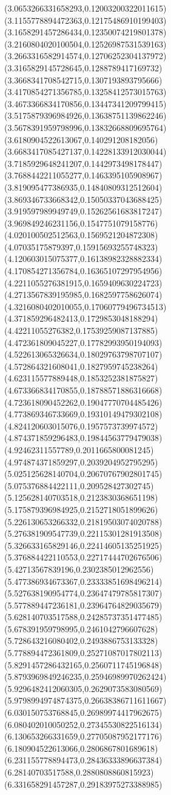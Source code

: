 {(3.0653266331658293,0.12003200322011615)
(3.1155778894472363,0.12175486910199403)
(3.1658291457286434,0.12350074219801378)
(3.2160804020100504,0.12526987531539163)
(3.2663316582914574,0.12706252304137972)
(3.3165829145728645,0.1288789417169732)
(3.3668341708542715,0.1307193893795666)
(3.4170854271356785,0.13258412573015763)
(3.4673366834170856,0.13447341209799415)
(3.5175879396984926,0.13638751139862246)
(3.5678391959798996,0.13832668809695764)
(3.6180904522613067,0.140291208182056)
(3.6683417085427137,0.14228133912030044)
(3.7185929648241207,0.1442973498178447)
(3.7688442211055277,0.1463395105908967)
(3.819095477386935,0.14840809312512604)
(3.869346733668342,0.15050337043688425)
(3.919597989949749,0.15262561683817247)
(3.969849246231156,0.1547751079158776)
(4.020100502512563,0.1569521204872308)
(4.07035175879397,0.15915693255748323)
(4.120603015075377,0.16138982328882334)
(4.170854271356784,0.16365107297954956)
(4.2211055276381915,0.1659409630224723)
(4.2713567839195985,0.1682597758626074)
(4.3216080402010055,0.17060779496734513)
(4.371859296482413,0.1729853048188294)
(4.42211055276382,0.17539259087137885)
(4.472361809045227,0.17782993950194093)
(4.522613065326634,0.18029763798707107)
(4.572864321608041,0.1827959745238264)
(4.623115577889448,0.1853252381875827)
(4.673366834170855,0.18788571886316668)
(4.723618090452262,0.19047770704485426)
(4.773869346733669,0.19310149479302108)
(4.824120603015076,0.1957573739974572)
(4.874371859296483,0.19844563779479038)
(4.92462311557789,0.2011665800081245)
(4.974874371859297,0.2039204952795295)
(5.025125628140704,0.20670767902801745)
(5.075376884422111,0.209528427302745)
(5.125628140703518,0.2123830368651198)
(5.175879396984925,0.2152718051899626)
(5.226130653266332,0.21819503074020788)
(5.276381909547739,0.22115301281913508)
(5.326633165829146,0.22414605135251925)
(5.376884422110553,0.22717444702676506)
(5.42713567839196,0.2302385012962556)
(5.477386934673367,0.23333851698496214)
(5.527638190954774,0.23647479785817307)
(5.577889447236181,0.23964764829035679)
(5.628140703517588,0.24285737351477485)
(5.678391959798995,0.2461042796607628)
(5.728643216080402,0.2493886753133328)
(5.778894472361809,0.25271087017802113)
(5.8291457286432165,0.2560711745196848)
(5.8793969849246235,0.25946989970262424)
(5.9296482412060305,0.2629073583080569)
(5.9798994974874375,0.26638386711611667)
(6.030150753768845,0.26989974417962675)
(6.080402010050252,0.27345530822516134)
(6.130653266331659,0.27705087952177176)
(6.180904522613066,0.2806867801689618)
(6.231155778894473,0.28436333896637384)
(6.28140703517588,0.2880808860815923)
(6.331658291457287,0.29183975273388985)
}
